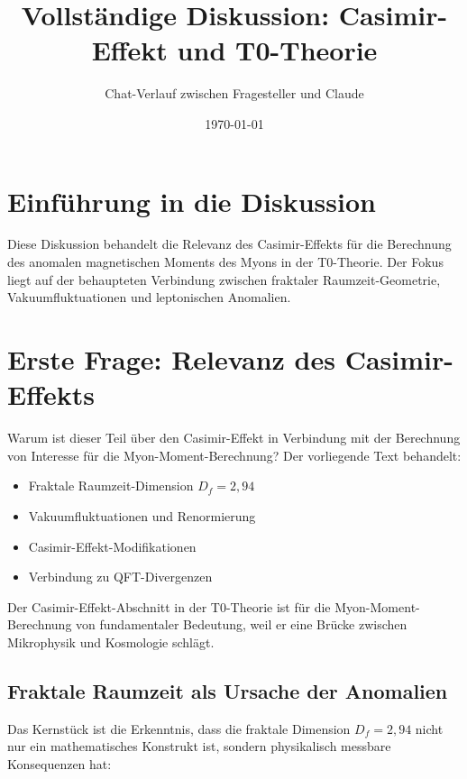 \documentclass[12pt,a4paper]{article}
\title{Vollst\"andige Diskussion: Casimir-Effekt und T0-Theorie}
\author{Chat-Verlauf zwischen Fragesteller und Claude}
\date{\today}
\begin{document}
	
	\maketitle
	
	\tableofcontents
	\newpage
	
	\section{Einf\"uhrung in die Diskussion}
	
	Diese Diskussion behandelt die Relevanz des Casimir-Effekts f\"ur die Berechnung des anomalen magnetischen Moments des Myons in der T0-Theorie. Der Fokus liegt auf der behaupteten Verbindung zwischen fraktaler Raumzeit-Geometrie, Vakuumfluktuationen und leptonischen Anomalien.
	
	\section{Erste Frage: Relevanz des Casimir-Effekts}
	
	\begin{question}
		Warum ist dieser Teil \"uber den Casimir-Effekt in Verbindung mit der Berechnung von Interesse f\"ur die Myon-Moment-Berechnung? Der vorliegende Text behandelt:
		
		\begin{itemize}
			\item Fraktale Raumzeit-Dimension $D_f = 2{,}94$
			\item Vakuumfluktuationen und Renormierung
			\item Casimir-Effekt-Modifikationen
			\item Verbindung zu QFT-Divergenzen
		\end{itemize}
	\end{question}
	

		Der Casimir-Effekt-Abschnitt in der T0-Theorie ist f\"ur die Myon-Moment-Berechnung von fundamentaler Bedeutung, weil er eine Br\"ucke zwischen Mikrophysik und Kosmologie schl\"agt.
		
		\subsection{Fraktale Raumzeit als Ursache der Anomalien}
		
		Das Kernst\"uck ist die Erkenntnis, dass die fraktale Dimension $D_f = 2{,}94$ nicht nur ein mathematisches Konstrukt ist, sondern physikalisch messbare Konsequenzen hat:
		
\end{document}
